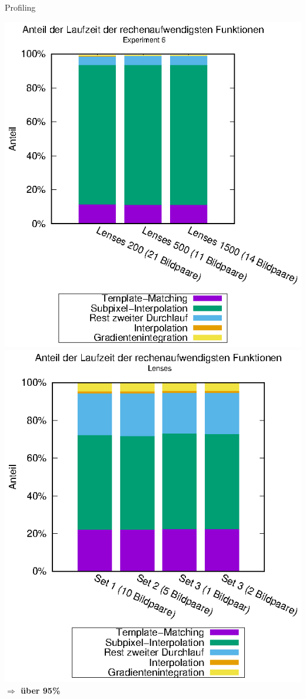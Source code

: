 \begin{frame}[allowframebreaks]{Profiling}
\begin{center}
		\includegraphics[width=0.53\linewidth]{pdf/slow_exp6.eps}
		\hspace{-1.5cm}
		\includegraphics[width=0.53\linewidth]{pdf/slow_lenses.eps}\\
		\textbf{$ \Rightarrow $ über 95\%}
	\end{center}
\end{frame}
